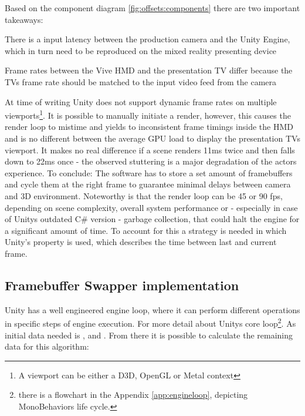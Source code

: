 
Based on the component diagram \ref{fig:offsets:components} there are two 
important takeaways: 

\begin{my_list}
	\item There is a input latency between the production camera and the Unity 
	Engine, which in turn need to be reproduced on the mixed reality presenting 
	device
	\item Frame rates between the Vive HMD and the presentation TV differ 
	because the TVs frame rate should be matched to the input video feed from 
	the camera
\end{my_list}

At time of writing Unity does not support dynamic frame rates on multiple 
viewports\footnote{A viewport can be either a D3D, OpenGL or Metal context}.
\newline
It is possible to manually initiate a render, however, this causes the render 
loop to mistime and yields to inconsistent frame timings inside the HMD and is 
no different between the average GPU load to display the presentation TVs 
viewport. It makes no real difference if a scene renders 11ms twice and then 
falls down to 22ms once - the observed stuttering is a major degradation of the 
actors experience.
\newline
To conclude: The software has to store a set amount of \gls{framebuffer}s and 
cycle them at the right frame to guarantee minimal delays between camera and 3D 
environment.
\newline
Noteworthy is that the render loop can be 45 or 90 fps, depending on scene 
complexity, overall system performance or - especially in case of Unitys 
outdated C\# version - garbage collection, that could halt the engine for a 
significant amount of time. To account for this a strategy is needed in which 
Unity's  property is used, which describes the time 
between last and current frame.

\subsection{Framebuffer Swapper implementation}

Unity has a well engineered engine loop, where it can perform different 
operations in specific steps of engine execution. For more detail about Unitys 
core loop\footnote{there is a flowchart in the Appendix \ref{app:engineloop}, 
depicting MonoBehaviors life cycle.}. As 
initial data needed is ,  and 
. From there it is possible to calculate the remaining 
data for this algorithm:

